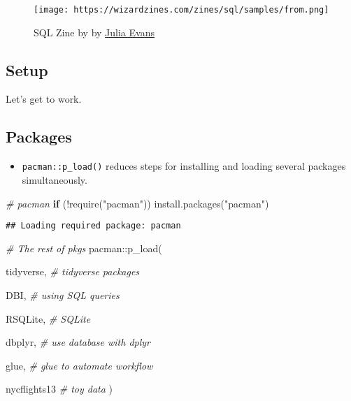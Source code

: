 \documentclass[
]{book}
\newenvironment{Shaded}{\begin{snugshade}}{\end{snugshade}}
\newcommand{\CommentTok}[1]{\textcolor[rgb]{0.56,0.35,0.01}{\textit{#1}}}
\newcommand{\ControlFlowTok}[1]{\textcolor[rgb]{0.13,0.29,0.53}{\textbf{#1}}}
\newcommand{\FunctionTok}[1]{\textcolor[rgb]{0.00,0.00,0.00}{#1}}
\newcommand{\NormalTok}[1]{#1}
\newcommand{\SpecialCharTok}[1]{\textcolor[rgb]{0.00,0.00,0.00}{#1}}
\newcommand{\StringTok}[1]{\textcolor[rgb]{0.31,0.60,0.02}{#1}}
\providecommand{\tightlist}{%
  \setlength{\itemsep}{0pt}\setlength{\parskip}{0pt}}
\begin{document}
\begin{figure}
\centering
\texttt{[image: https://wizardzines.com/zines/sql/samples/from.png]}
\caption{SQL Zine by by \href{https://jvns.ca/}{Julia Evans}}
\end{figure}

\hypertarget{setup-7}{%
\subsection{Setup}\label{setup-7}}

Let's get to work.

\hypertarget{packages-1}{%
\subsection{Packages}\label{packages-1}}

\begin{itemize}
\tightlist
\item
  \texttt{pacman::p\_load()} reduces steps for installing and loading several packages simultaneously.
\end{itemize}

\begin{Shaded}
\begin{Highlighting}[]
\CommentTok{\# pacman }
\ControlFlowTok{if}\NormalTok{ (}\SpecialCharTok{!}\FunctionTok{require}\NormalTok{(}\StringTok{"pacman"}\NormalTok{)) }\FunctionTok{install.packages}\NormalTok{(}\StringTok{"pacman"}\NormalTok{)}
\end{Highlighting}
\end{Shaded}

\begin{verbatim}
## Loading required package: pacman
\end{verbatim}

\begin{Shaded}
\begin{Highlighting}[]
\CommentTok{\# The rest of pkgs }
\NormalTok{pacman}\SpecialCharTok{::}\FunctionTok{p\_load}\NormalTok{(}
 
\NormalTok{ tidyverse, }\CommentTok{\# tidyverse packages }
 
\NormalTok{ DBI, }\CommentTok{\# using SQL queries}
 
\NormalTok{ RSQLite, }\CommentTok{\# SQLite}
 
\NormalTok{ dbplyr, }\CommentTok{\# use database with dplyr }
 
\NormalTok{ glue, }\CommentTok{\# glue to automate workflow }
 
\NormalTok{ nycflights13 }\CommentTok{\# toy data }
\NormalTok{)}
\end{Highlighting}
\end{Shaded}
\end{document}
